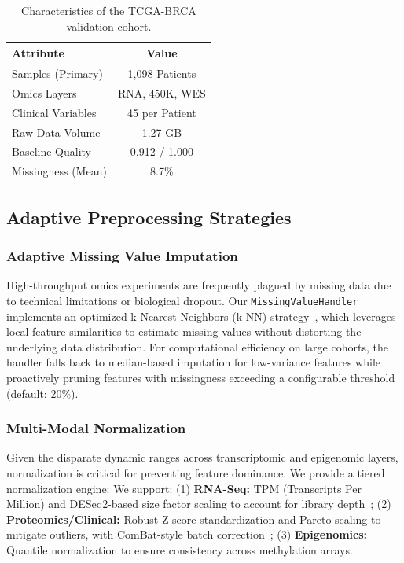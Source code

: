 \documentclass[12pt,a4paper,onecolumn]{article}
\begin{document}
\begin{table}[H]
\caption{Characteristics of the TCGA-BRCA validation cohort.}\label{tab:dataset}
\centering
\small
\renewcommand{\arraystretch}{0.95}
\begin{tabularx}{\columnwidth}{L C}
\toprule
\textbf{Attribute} & \textbf{Value} \\
\midrule
Samples (Primary)    & 1,098 Patients \\
Omics Layers                & RNA, 450K, WES \\
Clinical Variables          & 45 per Patient \\
Raw Data Volume             & 1.27 GB \\
Baseline Quality            & 0.912 / 1.000 \\
Missingness (Mean)          & 8.7\% \\
\bottomrule
\end{tabularx}
\end{table}

\subsection{Adaptive Preprocessing Strategies}

\subsubsection{Adaptive Missing Value Imputation}
High-throughput omics experiments are frequently plagued by missing data due to technical limitations or biological dropout. Our \texttt{MissingValueHandler} implements an optimized k-Nearest Neighbors (k-NN) strategy~\cite{troyanskaya2001}, which leverages local feature similarities to estimate missing values without distorting the underlying data distribution. For computational efficiency on large cohorts, the handler falls back to median-based imputation for low-variance features while proactively pruning features with missingness exceeding a configurable threshold (default: 20\%).

\subsubsection{Multi-Modal Normalization}
Given the disparate dynamic ranges across transcriptomic and epigenomic layers, normalization is critical for preventing feature dominance. We provide a tiered normalization engine:
We support: (1) \textbf{RNA-Seq:} TPM (Transcripts Per Million) and DESeq2-based size factor scaling to account for library depth~\cite{ritchie2015}; (2) \textbf{Proteomics/Clinical:} Robust Z-score standardization and Pareto scaling to mitigate outliers, with ComBat-style batch correction~\cite{johnson2007}; (3) \textbf{Epigenomics:} Quantile normalization to ensure consistency across methylation arrays.
\end{document}
